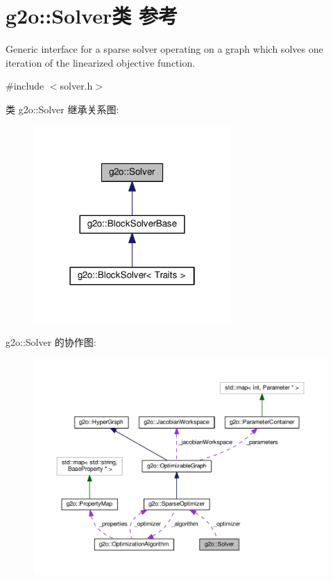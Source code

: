 \hypertarget{classg2o_1_1Solver}{\section{g2o\-:\-:Solver类 参考}
\label{classg2o_1_1Solver}
}


Generic interface for a sparse solver operating on a graph which solves one iteration of the linearized objective function.  




{\ttfamily \#include $<$solver.\-h$>$}



类 g2o\-:\-:Solver 继承关系图\-:
\nopagebreak
\begin{figure}[H]
\begin{center}
\leavevmode
\includegraphics[width=214pt]{classg2o_1_1Solver__inherit__graph}
\end{center}
\end{figure}


g2o\-:\-:Solver 的协作图\-:
\nopagebreak
\begin{figure}[H]
\begin{center}
\leavevmode
\includegraphics[width=350pt]{classg2o_1_1Solver__coll__graph}
\end{center}
\end{figure}
